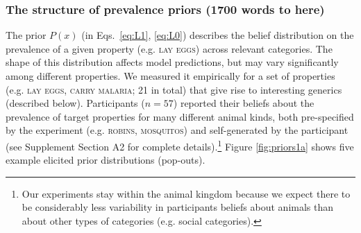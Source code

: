 \documentclass[10pt,letterpaper]{article}
\begin{document}

\subsubsection*{The structure of prevalence priors (1700 words to here)} 

 The prior $P(x)$ (in Eqs.~\ref{eq:L1}, \ref{eq:L0}) describes the belief distribution on the prevalence of a given property (e.g. \textsc{lay eggs}) across relevant categories. 
The shape of this distribution affects model predictions, but may vary significantly among different properties.
 We measured it empirically for a set of properties (e.g. \textsc{lay eggs, carry malaria}; 21 in total) that give rise to interesting generics (described below). 
 Participants ($n=57$) reported their beliefs about the prevalence of target properties for many different animal kinds, both pre-specified by the experiment (e.g. \textsc{robins, mosquitos}) and self-generated by the participant (see Supplement Section A2 for complete details).\footnote{Our experiments stay within the animal kingdom because we expect there to be considerably less variability in participants beliefs about animals than about other types of categories (e.g. social categories).} 
 Figure \ref{fig:priors1a} shows five example elicited prior distributions (pop-outs).
\end{document}
